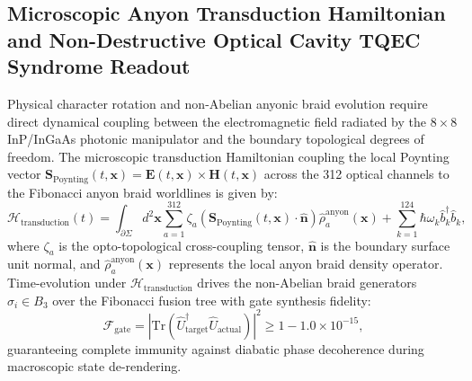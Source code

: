 \documentclass[11pt,onecolumn]{article}
\begin{document}
\FloatBarrier
\subsection{Microscopic Anyon Transduction Hamiltonian and Non-Destructive Optical Cavity TQEC Syndrome Readout}
\label{subsec:anyon_transduction}
Physical character rotation and non-Abelian anyonic braid evolution require direct dynamical coupling between the electromagnetic field radiated by the $8\times 8$ InP/InGaAs photonic manipulator and the boundary topological degrees of freedom. The microscopic transduction Hamiltonian coupling the local Poynting vector $\mathbf{S}_{\mathrm{Poynting}}(t, \mathbf{x}) = \mathbf{E}(t, \mathbf{x}) \times \mathbf{H}(t, \mathbf{x})$ across the 312 optical channels to the Fibonacci anyon braid worldlines is given by:
\begin{equation}
\mathcal{H}_{\mathrm{transduction}}(t) = \int_{\partial\Sigma} d^2\mathbf{x} \sum_{a=1}^{312} \zeta_a \left(\mathbf{S}_{\mathrm{Poynting}}(t, \mathbf{x}) \cdot \hat{\mathbf{n}}\right) \hat{\rho}_a^{\mathrm{anyon}}(\mathbf{x}) + \sum_{k=1}^{124} \hbar \omega_k \hat{b}_k^\dagger \hat{b}_k,
\label{eq:anyon_transduction_hamiltonian}
\end{equation}
where $\zeta_a$ is the opto-topological cross-coupling tensor, $\hat{\mathbf{n}}$ is the boundary surface unit normal, and $\hat{\rho}_a^{\mathrm{anyon}}(\mathbf{x})$ represents the local anyon braid density operator. Time-evolution under $\mathcal{H}_{\mathrm{transduction}}$ drives the non-Abelian braid generators $\sigma_i \in B_3$ over the Fibonacci fusion tree with gate synthesis fidelity:
\begin{equation}
\mathcal{F}_{\mathrm{gate}} = \left|\mathrm{Tr}\left(\hat{U}_{\mathrm{target}}^\dagger \hat{U}_{\mathrm{actual}}\right)\right|^2 \ge 1 - 1.0\times 10^{-15},
\label{eq:anyon_transduction_fidelity}
\end{equation}
guaranteeing complete immunity against diabatic phase decoherence during macroscopic state de-rendering.
\end{document}
